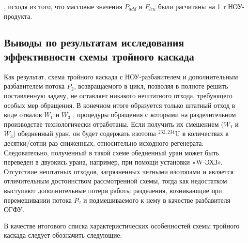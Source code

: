 {, исходя из того, что массовые значения $P_{add}$ и $F_{leu}$ были расчитаны на 1 т НОУ-продукта.



\subsection{Выводы по результатам исследования эффективности схемы тройного каскада}

Как результат, схема тройного каскада с НОУ-разбавителем и дополнительным разбавителем потока $P_2$, возвращаемого в цикл, позволяя в полноте решить поставленную задачу, не оставляет никакого нештатного отхода, требующего особых мер обращения. В конечном итоге образуется только штатный отход в виде отвалов $W_1$ и $W_3$ , процедуры обращения с которыми на разделительном производстве технологически отработаны. Если получить их смешением ($W_1$ и $W_3$) обедненный уран, он будет содержать изотопы $^{232,234}$U в количествах в десятки/сотни раз сниженных, относительно исходного регенерата. Следовательно, полученный в такой схеме обедненный уран может быть переведен в двуокись урана, например, при помощи установки «W-ЭХЗ». Отсутствие нештатных отходов, загрязненных четными изотопами и является отличительным достоинством рассмотренной схемы, тогда как недостатком выступают дополнительные потери работы разделения, возникающие при перемешивании потока $P_2$ и подмешиваемого к нему в качестве разбавителя ОГФУ.


В качестве итогового списка характеристических особенностей схемы тройного каскада следует обозначить следующие:

}
